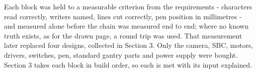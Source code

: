 Each block was held to a measurable criterion from the requirements - characters read correctly, writers named, lines cut correctly, pen position in millimetres - and measured alone before the chain was measured end to end; where no known truth exists, as for the drawn page, a round trip was used. That measurement later replaced four designs, collected in Section 3. Only the camera, SBC, motors, drivers, switches, pen, standard gantry parts and power supply were bought.  Section 3 takes each block in build order, so each is met with its input explained.
